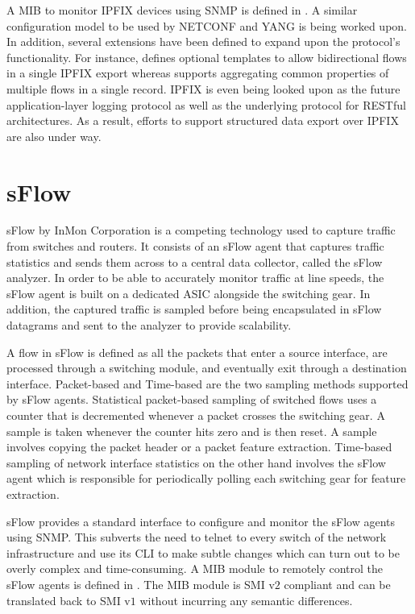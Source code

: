 A \ac{MIB} to monitor \ac{IPFIX} devices using \ac{SNMP} is defined in \cite{rfc5815}. A similar configuration model to be used by NETCONF and YANG is being worked upon. In addition, several extensions have been defined to expand upon the protocol's functionality. For instance, \cite{rfc5103} defines optional templates to allow bidirectional flows in a single \ac{IPFIX} export whereas \cite{rfc5474} supports aggregating common properties of multiple flows in a  single record. \ac{IPFIX} is even being looked upon as the future application-layer logging protocol as well as the underlying protocol for RESTful architectures. As a result, efforts to support structured data export over \ac{IPFIX} are also under way.

\section{sFlow}\label{sec:sflow}
sFlow \cite{rfc3176} by InMon Corporation is a competing technology used to capture traffic from switches and routers. It consists of an sFlow agent that captures traffic statistics and sends them across to a central data collector, called the sFlow analyzer. In order to be able to accurately monitor traffic at line speeds, the sFlow agent is built on a dedicated ASIC alongside the switching gear. In addition, the captured traffic is sampled before being encapsulated in sFlow datagrams and sent to the analyzer to provide scalability.

A flow in sFlow is defined as all the packets that enter a source interface, are processed through a switching module, and eventually exit through a destination interface. Packet-based and Time-based are the two sampling methods supported by sFlow agents. Statistical packet-based sampling of switched flows uses a  counter that is decremented whenever a packet crosses the switching gear. A sample is taken whenever the counter hits zero and is then reset. A sample involves copying the packet header or a packet feature extraction. Time-based sampling of network interface statistics on the other hand involves the sFlow agent which is responsible for periodically polling each switching gear for feature extraction.

sFlow provides a standard interface to configure and monitor the sFlow agents using \ac{SNMP}. This subverts the need to telnet to every switch of the network infrastructure and use its \ac{CLI} to make subtle changes which can turn out to be  overly complex and time-consuming. A \ac{MIB} module to remotely control the sFlow agents is defined in \cite{rfc3176}. The \ac{MIB} module is \ac{SMI} v$2$ compliant and can be translated back to \ac{SMI} v$1$ without incurring any semantic differences.


